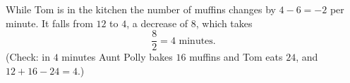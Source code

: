 While Tom is in the kitchen the number of muffins changes by $4-6=-2$ per minute. It falls from $12$ to $4$, a decrease of $8$, which takes
\[
\dfrac{8}{2}=\boxed{4\text{ minutes}}.
\]
(Check: in $4$ minutes Aunt Polly bakes $16$ muffins and Tom eats $24$, and $12+16-24=4$.)
